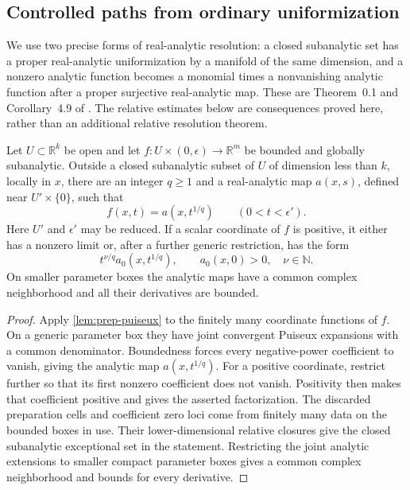 \subsection{Controlled paths from ordinary uniformization}

We use two precise forms of real-analytic resolution: a closed subanalytic set has a proper real-analytic uniformization by a manifold of the same dimension, and a nonzero analytic function becomes a monomial times a nonvanishing analytic function after a proper surjective real-analytic map.  These are Theorem~0.1 and Corollary~4.9 of \cite{BierstoneMilman1988}.  The relative estimates below are consequences proved here, rather than an additional relative resolution theorem.

\begin{lemma}
\label{lem:loc-puiseux}
Let $U\subset\mathbb{R}^k$ be open and let $f:U\times(0,\epsilon)\to\mathbb{R}^m$ be bounded and globally subanalytic. Outside a closed subanalytic subset of $U$ of dimension less than $k$, locally in $x$, there are an integer $q\geq1$ and a real-analytic map $a(x,s)$, defined near $U'\times\{0\}$, such that
\[
                 f(x,t)=a(x,t^{1/q})\qquad(0<t<\epsilon').
\]
Here $U'$ and $\epsilon'$ may be reduced.  If a scalar coordinate of $f$ is positive, it either has a nonzero limit or, after a further generic restriction, has the form
\[
                 t^{\nu/q}a_0(x,t^{1/q}),\qquad a_0(x,0)>0,
                 \quad \nu\in\mathbb{N}.
\]
On smaller parameter boxes the analytic maps have a common complex neighborhood and all their derivatives are bounded.
\end{lemma}

\begin{proof}
Apply \cref{lem:prep-puiseux} to the finitely many coordinate functions of $f$.  On a generic parameter box they have joint convergent Puiseux expansions with a common denominator.  Boundedness forces every negative-power coefficient to vanish, giving the analytic map $a(x,t^{1/q})$.  For a positive coordinate, restrict further so that its first nonzero coefficient does not vanish. Positivity then makes that coefficient positive and gives the asserted factorization.  The discarded preparation cells and coefficient zero loci come from finitely many data on the bounded boxes in use.  Their lower-dimensional relative closures give the closed subanalytic exceptional set in the statement.  Restricting the joint analytic extensions to smaller compact parameter boxes gives a common complex neighborhood and bounds for every derivative.
\end{proof}

